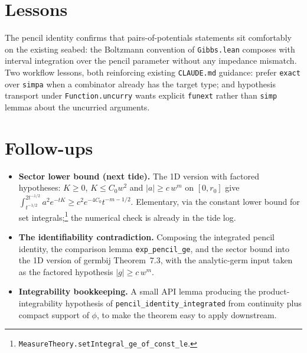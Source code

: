 \documentclass[11pt]{article}
\begin{document}
\section{Lessons}

The pencil identity confirms that pairs-of-potentials statements sit
comfortably on the existing seabed: the Boltzmann convention of
\texttt{Gibbs.lean} composes with interval integration over the pencil
parameter without any impedance mismatch. Two workflow lessons, both
reinforcing existing \texttt{CLAUDE.md} guidance: prefer \texttt{exact}
over \texttt{simpa} when a combinator already has the target type; and
hypothesis transport under \texttt{Function.uncurry} wants explicit
\texttt{funext} rather than \texttt{simp} lemmas about the uncurried
arguments.

\section{Follow-ups}

\begin{itemize}
\item \textbf{Sector lower bound (next tide).} The 1D version with factored
hypotheses: $K \ge 0$, $K \le C_0 w^2$ and $|a| \ge c\,w^m$ on $[0, r_0]$
give $\int_{t^{-1/2}}^{2t^{-1/2}} a^2 e^{-tK} \ge c^2 e^{-4C_0}
t^{-m-1/2}$. Elementary, via the constant lower bound for set
integrals;\footnote{\texttt{MeasureTheory.setIntegral\_ge\_of\_const\_le}.}
the numerical check is already in the tide log.
\item \textbf{The identifiability contradiction.} Composing the
integrated pencil identity, the comparison lemma
\texttt{exp\_pencil\_ge}, and the sector bound into the 1D version of
germbij Theorem~7.3, with the analytic-germ input taken as the factored
hypothesis $|g| \ge c\,w^m$.
\item \textbf{Integrability bookkeeping.} A small API lemma producing the
product-integrability hypothesis of \texttt{pencil\_identity\_integrated}
from continuity plus compact support of $\phi$, to make the theorem easy
to apply downstream.
\end{itemize}
\end{document}
